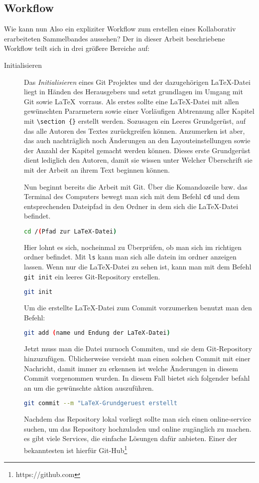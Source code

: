 \documentclass[12pt,a4paper]{scrartcl}
\begin{document}
\subsection{Workflow}
Wie kann nun Also ein expliziter Workflow zum erstellen eines Kollaborativ erarbeiteten Sammelbandes aussehen? Der in dieser Arbeit beschriebene Workflow teilt sich in drei größere Bereiche auf:

\begin{description}
\item[Initialisieren] Das \emph{Initialisieren} eines Git Projektes und der dazugehörigen \LaTeX -Datei liegt in Händen des Herausgebers und setzt grundlagen im Umgang mit Git sowie \LaTeX \ vorraus. Als erstes sollte eine \LaTeX -Datei mit allen gewünschten Pararmetern sowie einer Vorläufigen Abtrennung aller Kapitel mit \verb+\section+~\verb+{}+ erstellt werden. Sozusagen ein Leeres Grundgerüst, auf das alle Autoren des Textes zurückgreifen können. Anzumerken ist aber, das auch nachträglich noch Änderungen an den Layouteinstellungen sowie der Anzahl der Kapitel gemacht werden können. Dieses erste Grundgerüst dient lediglich den Autoren, damit sie wissen unter Welcher Überschrift sie mit der Arbeit an ihrem Text beginnen können.

Nun beginnt bereits die Arbeit mit Git. Über die Komandozeile bzw. das Terminal des Computers bewegt man sich mit dem Befehl \verb+cd+ und dem entsprechenden Dateipfad in den Ordner in dem sich die \LaTeX -Datei befindet.
\begin{lstlisting}[language=bash]
cd /(Pfad zur LaTeX-Datei)
\end{lstlisting}
 Hier lohnt es sich, nocheinmal zu Überprüfen, ob man sich im richtigen ordner befindet. Mit \verb+ls+ kann man sich alle datein im ordner anzeigen lassen. Wenn nur die \LaTeX-Datei zu sehen ist, kann man mit dem Befehl \verb+git init+ ein leeres Git-Repository erstellen.
\begin{lstlisting}[language=bash]
git init
\end{lstlisting}
 Um die erstellte \LaTeX -Datei zum Commit vorzumerken benutzt man den Befehl:
\begin{lstlisting}[language=bash]
git add (name und Endung der LaTeX-Datei)
\end{lstlisting} Jetzt muss man die Datei nurnoch Commiten, und sie dem Git-Repository hinzuzufügen. Üblicherweise versieht man einen solchen Commit mit einer Nachricht, damit immer zu erkennen ist welche Änderungen in diesem Commit vorgenommen wurden. In diesem Fall bietet sich folgender befahl an um die gewünschte aktion auszuführen.
\begin{lstlisting}[language=bash]
git commit --m "LaTeX-Grundgeruest erstellt
\end{lstlisting}
Nachdem das Repository lokal vorliegt sollte man sich einen online-service suchen, um das Repository hochzuladen und online zugänglich zu machen. es gibt viele Services, die einfache Lösungen dafür anbieten. Einer der bekanntesten ist hierfür Git-Hub\footnote{https://github.com}


\end{description}
\end{document}
